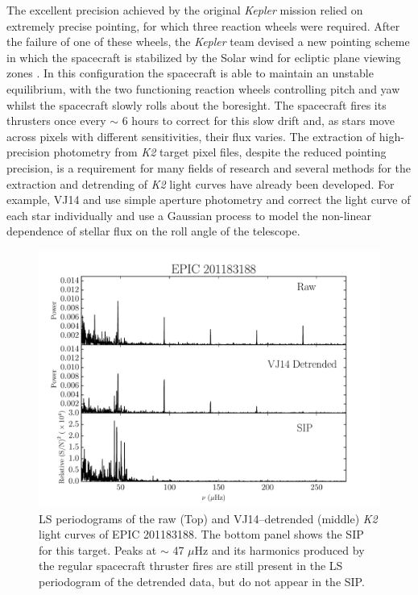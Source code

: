 The excellent precision achieved by the original {\it Kepler} mission relied
on extremely precise pointing, for which three reaction wheels were required.
After the failure of one of these wheels, the {\it Kepler} team devised a new
pointing scheme in which the spacecraft is stabilized by the Solar wind for
ecliptic plane viewing zones \citep{Howell2014}.
In this configuration the spacecraft is able to maintain an unstable
equilibrium, with the two functioning reaction wheels controlling pitch and
yaw whilst the spacecraft slowly rolls about the boresight.
The spacecraft fires its thrusters once every $\sim$ 6 hours
\citep[][hereafter VJ14]{Vanderburg2014} to correct for
this slow drift and, as stars move across pixels with different sensitivities,
their flux varies.
The extraction of high-precision photometry from {\it K2} target pixel files,
despite the reduced pointing precision, is a requirement for many fields of
research and several methods for the extraction and detrending of {\it K2}
light curves have already been developed.
For example, VJ14 and \citet{Crossfield2015}
use simple aperture photometry and correct the light curve of each star
individually and \citet{Aigrain2015} use a Gaussian process to model the
non-linear dependence of stellar flux on the roll angle of the telescope.

\begin{figure}[p]
\begin{center}
\includegraphics[width=6in, clip=true]{figures/rawvbg_201183188.pdf}
\caption{LS periodograms of the raw (Top) and VJ14--detrended (middle) {\it K2}
	 light curves of EPIC 201183188.
	 The bottom panel shows the SIP for this target.
	 Peaks at $\sim$ 47 $\mu$Hz and its harmonics produced by the regular
	 spacecraft thruster fires are still present in the LS periodogram of
	 the detrended data, but do not appear in the SIP.}
\label{fig:raw}
\end{center}
\end{figure}


